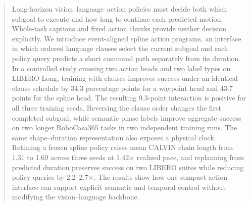 \begin{abstract}
Long-horizon vision--language--action policies must decide both which subgoal to execute and how long to continue each predicted motion. Whole-task captions and fixed action chunks provide neither decision explicitly. We introduce event-aligned spline action programs, an interface in which ordered language clauses select the current subgoal and each policy query predicts a short command path separately from its duration. In a controlled study crossing two action heads and two label types on LIBERO-Long, training with clauses improves success under an identical clause schedule by 34.3 percentage points for a waypoint head and 43.7 points for the spline head. The resulting 9.3-point interaction is positive for all three training seeds. Reversing the clause order changes the first completed subgoal, while semantic phase labels improve aggregate success on two longer RoboCasa365 tasks in two independent training runs. The same shape--duration representation also exposes a physical clock. Retiming a frozen spline policy raises mean CALVIN chain length from 1.31 to 1.69 across three seeds at 1.42$\times$ realized pace, and replanning from predicted duration preserves success on two LIBERO suites while reducing policy queries by 2.2--2.7$\times$. The results show how one compact action interface can support explicit semantic and temporal control without modifying the vision--language backbone.
\end{abstract}
